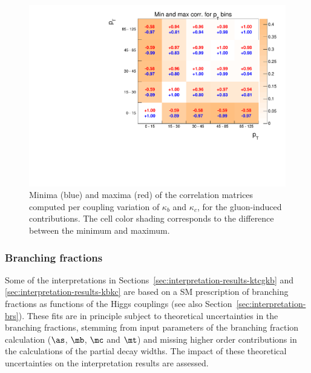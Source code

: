 \begin{figure}[hbtp]
  \begin{center}
    \includegraphics[width=\halflinewidth]{img/interpretation/other/minmax_corrMat_exp.pdf}
    \caption{
        Minima (blue) and maxima (red) of the correlation matrices computed per coupling variation of $\kappa_b$ and $\kappa_c$, for the gluon-induced contributions.
        The cell color shading corresponds to the difference between the minimum and maximum.
        }
    \label{fig:corrmat-minmax}
  \end{center}
\end{figure}




\subsubsection{Branching fractions}

Some of the interpretations in Sections~\ref{sec:interpretation-results-ktcgkb} and \ref{sec:interpretation-results-kbkc} are based on a SM prescription of branching fractions as functions of the Higgs couplings (see also Section~\ref{sec:interpretation-brs}).
% 
These fits are in principle subject to theoretical uncertainties in the branching fractions, stemming from input parameters of the branching fraction calculation ($\as$, $\mb$, $\mc$ and $\mt$) and missing higher order contributions in the calculations of the partial decay widths.
% 
The impact of these theoretical uncertainties on the interpretation results are assessed.


